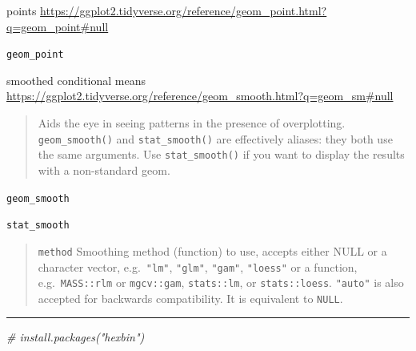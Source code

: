 \documentclass[
]{book}
\newenvironment{Shaded}{\begin{snugshade}}{\end{snugshade}}
\newcommand{\CommentTok}[1]{\textcolor[rgb]{0.56,0.35,0.01}{\textit{#1}}}
\theoremstyle{definition}
\theoremstyle{definition}
\theoremstyle{definition}
\theoremstyle{definition}
\theoremstyle{remark}
\begin{document}
points \url{https://ggplot2.tidyverse.org/reference/geom_point.html?q=geom_point\#null}

\texttt{geom\_point}

smoothed conditional means \url{https://ggplot2.tidyverse.org/reference/geom_smooth.html?q=geom_sm\#null}

\begin{quote}
Aids the eye in seeing patterns in the presence of overplotting. \texttt{geom\_smooth()} and \texttt{stat\_smooth()} are effectively aliases: they both use the same arguments. Use \texttt{stat\_smooth()} if you want to display the results with a non-standard geom.
\end{quote}

\texttt{geom\_smooth}

\texttt{stat\_smooth}

\begin{quote}
\texttt{method} Smoothing method (function) to use, accepts either NULL or a character vector, e.g.~\texttt{"lm"}, \texttt{"glm"}, \texttt{"gam"}, \texttt{"loess"} or a function, e.g.~\texttt{MASS::rlm} or \texttt{mgcv::gam}, \texttt{stats::lm}, or \texttt{stats::loess}. \texttt{"auto"} is also accepted for backwards compatibility. It is equivalent to \texttt{NULL}.
\end{quote}

\begin{center}\rule{0.5\linewidth}{0.5pt}\end{center}

\begin{Shaded}
\begin{Highlighting}[]
\CommentTok{\# install.packages("hexbin")}
\end{Highlighting}
\end{Shaded}
\end{document}

